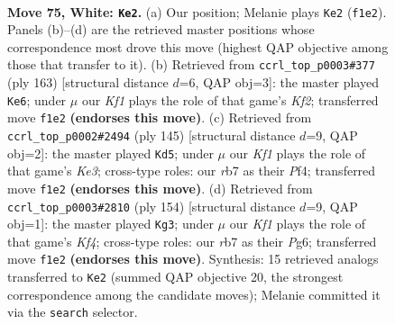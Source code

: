 \documentclass[11pt]{article}
\begin{document}
\clearpage

\begin{figure}[p]\centering
\begin{subfigure}{0.46\textwidth}\centering
\resizebox{\linewidth}{!}{%
\newchessgame
\chessboard[
  setfen={8/1r6/6k1/4p3/5p2/6p1/8/5K2 w - - 0 75},
  showmover=false,
  pgfstyle=straightmove, color=movearrow, markmove={f1-e2}
]}
\caption{}
\end{subfigure}\hfill
\begin{subfigure}{0.46\textwidth}\centering
\resizebox{\linewidth}{!}{%
\newchessgame
\chessboard[
  setfen={R7/5k2/8/7P/6P1/3B1P2/6K1/8 b - - 0 82},
  showmover=false,
  pgfstyle=straightmove, color=movearrow, markmove={f7-e6}
]}
\caption{}
\end{subfigure}
\\[4pt]
\begin{subfigure}{0.46\textwidth}\centering
\resizebox{\linewidth}{!}{%
\newchessgame
\chessboard[
  setfen={8/8/4k3/6Pp/5p1P/8/8/6K1 b - - 11 73},
  showmover=false,
  pgfstyle=straightmove, color=movearrow, markmove={e6-d5}
]}
\caption{}
\end{subfigure}\hfill
\begin{subfigure}{0.46\textwidth}\centering
\resizebox{\linewidth}{!}{%
\newchessgame
\chessboard[
  setfen={8/6p1/6Pp/8/5K2/3k4/1P6/8 w - - 7 78},
  showmover=false,
  pgfstyle=straightmove, color=movearrow, markmove={f4-g3}
]}
\caption{}
\end{subfigure}
\caption{\textbf{Move 75, White: \texttt{Ke2}.} (a) Our position; Melanie plays \texttt{Ke2} (\texttt{f1e2}). Panels (b)--(d) are the retrieved master positions whose correspondence most drove this move (highest QAP objective among those that transfer to it). (b) Retrieved from \texttt{ccrl\_top\_p0003\#377} (ply 163) [structural distance $d$=6, QAP obj=3]: the master played \texttt{Ke6}; under $\mu$ our \emph{Kf1} plays the role of that game's \emph{Kf2}; transferred move \texttt{f1e2} \textbf{(endorses this move)}. (c) Retrieved from \texttt{ccrl\_top\_p0002\#2494} (ply 145) [structural distance $d$=9, QAP obj=2]: the master played \texttt{Kd5}; under $\mu$ our \emph{Kf1} plays the role of that game's \emph{Ke3}; cross-type roles: our \emph{r}b7 as their \emph{P}f4; transferred move \texttt{f1e2} \textbf{(endorses this move)}. (d) Retrieved from \texttt{ccrl\_top\_p0003\#2810} (ply 154) [structural distance $d$=9, QAP obj=1]: the master played \texttt{Kg3}; under $\mu$ our \emph{Kf1} plays the role of that game's \emph{Kf4}; cross-type roles: our \emph{r}b7 as their \emph{P}g6; transferred move \texttt{f1e2} \textbf{(endorses this move)}. Synthesis: 15 retrieved analogs transferred to \texttt{Ke2} (summed QAP objective 20, the strongest correspondence among the candidate moves); Melanie committed it via the \texttt{search} selector.}
\label{fig:thought-m148}
\end{figure}
\end{document}
